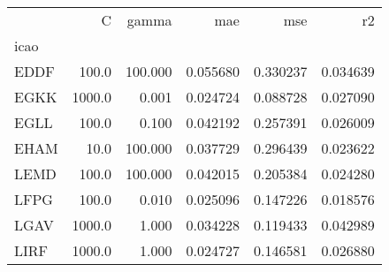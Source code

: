 \begin{tabular}{lrrrrr}
\toprule
{} &       C &    gamma &       mae &       mse &        r2 \\
icao &         &          &           &           &           \\
\midrule
EDDF &   100.0 &  100.000 &  0.055680 &  0.330237 &  0.034639 \\
EGKK &  1000.0 &    0.001 &  0.024724 &  0.088728 &  0.027090 \\
EGLL &   100.0 &    0.100 &  0.042192 &  0.257391 &  0.026009 \\
EHAM &    10.0 &  100.000 &  0.037729 &  0.296439 &  0.023622 \\
LEMD &   100.0 &  100.000 &  0.042015 &  0.205384 &  0.024280 \\
LFPG &   100.0 &    0.010 &  0.025096 &  0.147226 &  0.018576 \\
LGAV &  1000.0 &    1.000 &  0.034228 &  0.119433 &  0.042989 \\
LIRF &  1000.0 &    1.000 &  0.024727 &  0.146581 &  0.026880 \\
\bottomrule
\end{tabular}
